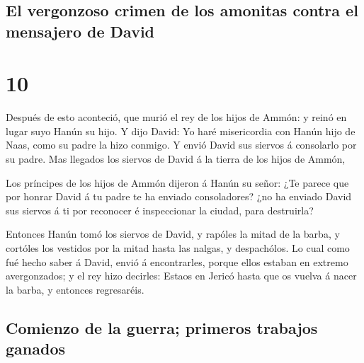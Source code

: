 \hypertarget{el-vergonzoso-crimen-de-los-amonitas-contra-el-mensajero-de-david}{%
\subsection{El vergonzoso crimen de los amonitas contra el mensajero de
David}\label{el-vergonzoso-crimen-de-los-amonitas-contra-el-mensajero-de-david}}

\hypertarget{section-9}{%
\section{10}\label{section-9}}

 Después de esto aconteció, que murió el rey de los hijos de
Ammón: y reinó en lugar suyo Hanún su hijo.  Y dijo David:
Yo haré misericordia con Hanún hijo de Naas, como su padre la hizo
conmigo. Y envió David sus siervos á consolarlo por su padre. Mas
llegados los siervos de David á la tierra de los hijos de Ammón,

 Los príncipes de los hijos de Ammón dijeron á Hanún su
señor: ¿Te parece que por honrar David á tu padre te ha enviado
consoladores? ¿no ha enviado David sus siervos á ti por reconocer é
inspeccionar la ciudad, para destruirla?

 Entonces Hanún tomó los siervos de David, y rapóles la
mitad de la barba, y cortóles los vestidos por la mitad hasta las
nalgas, y despachólos.  Lo cual como fué hecho saber á
David, envió á encontrarles, porque ellos estaban en extremo
avergonzados; y el rey hizo decirles: Estaos en Jericó hasta que os
vuelva á nacer la barba, y entonces regresaréis.

\hypertarget{comienzo-de-la-guerra-primeros-trabajos-ganados}{%
\subsection{Comienzo de la guerra; primeros trabajos
ganados}\label{comienzo-de-la-guerra-primeros-trabajos-ganados}}

